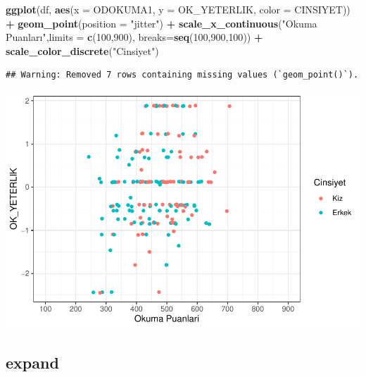 \documentclass[
  oneside]{book}
\newenvironment{Shaded}{\begin{snugshade}}{\end{snugshade}}
\newcommand{\AttributeTok}[1]{\textcolor[rgb]{0.13,0.29,0.53}{#1}}
\newcommand{\DecValTok}[1]{\textcolor[rgb]{0.00,0.00,0.81}{#1}}
\newcommand{\FunctionTok}[1]{\textcolor[rgb]{0.13,0.29,0.53}{\textbf{#1}}}
\newcommand{\NormalTok}[1]{#1}
\newcommand{\SpecialCharTok}[1]{\textcolor[rgb]{0.81,0.36,0.00}{\textbf{#1}}}
\newcommand{\StringTok}[1]{\textcolor[rgb]{0.31,0.60,0.02}{#1}}
\begin{document}
\begin{Shaded}
\begin{Highlighting}[]
\FunctionTok{ggplot}\NormalTok{(df, }\FunctionTok{aes}\NormalTok{(}\AttributeTok{x =}\NormalTok{ ODOKUMA1,}
\AttributeTok{y =}\NormalTok{ OK\_YETERLIK,}
\AttributeTok{color =}\NormalTok{ CINSIYET)) }\SpecialCharTok{+}
\FunctionTok{geom\_point}\NormalTok{(}\AttributeTok{position =} \StringTok{"jitter"}\NormalTok{) }\SpecialCharTok{+}
\FunctionTok{scale\_x\_continuous}\NormalTok{(}\StringTok{"Okuma Puanları"}\NormalTok{,}\AttributeTok{limits =} \FunctionTok{c}\NormalTok{(}\DecValTok{100}\NormalTok{,}\DecValTok{900}\NormalTok{),}
         \AttributeTok{breaks=}\FunctionTok{seq}\NormalTok{(}\DecValTok{100}\NormalTok{,}\DecValTok{900}\NormalTok{,}\DecValTok{100}\NormalTok{)) }\SpecialCharTok{+}
\FunctionTok{scale\_color\_discrete}\NormalTok{(}\StringTok{"Cinsiyet"}\NormalTok{)}
\end{Highlighting}
\end{Shaded}

\begin{verbatim}
## Warning: Removed 7 rows containing missing values (`geom_point()`).
\end{verbatim}

\begin{center}\includegraphics[width=1\linewidth]{15-betimleyici-istatistik_files/figure-latex/unnamed-chunk-53-1} \end{center}

\hypertarget{expand}{%
\subsection{expand}\label{expand}}
\end{document}
